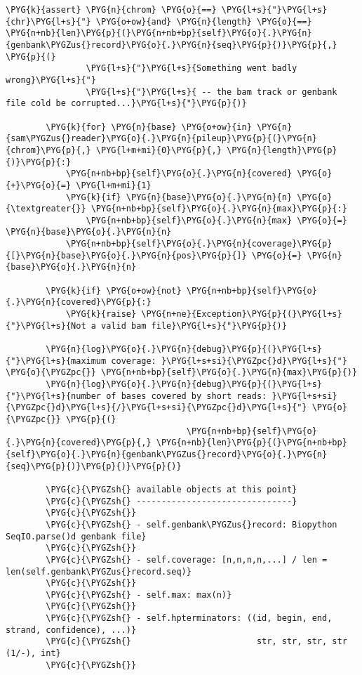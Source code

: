 \begin{Verbatim}[commandchars=\\\{\}]
        \PYG{k}{assert} \PYG{n}{chrom} \PYG{o}{==} \PYG{l+s}{"}\PYG{l+s}{chr}\PYG{l+s}{"} \PYG{o+ow}{and} \PYG{n}{length} \PYG{o}{==} \PYG{n+nb}{len}\PYG{p}{(}\PYG{n+nb+bp}{self}\PYG{o}{.}\PYG{n}{genbank\PYGZus{}record}\PYG{o}{.}\PYG{n}{seq}\PYG{p}{)}\PYG{p}{,} \PYG{p}{(}
                \PYG{l+s}{"}\PYG{l+s}{Something went badly wrong}\PYG{l+s}{"}
                \PYG{l+s}{"}\PYG{l+s}{ -- the bam track or genbank file cold be corrupted...}\PYG{l+s}{"}\PYG{p}{)}

        \PYG{k}{for} \PYG{n}{base} \PYG{o+ow}{in} \PYG{n}{sam\PYGZus{}reader}\PYG{o}{.}\PYG{n}{pileup}\PYG{p}{(}\PYG{n}{chrom}\PYG{p}{,} \PYG{l+m+mi}{0}\PYG{p}{,} \PYG{n}{length}\PYG{p}{)}\PYG{p}{:}
            \PYG{n+nb+bp}{self}\PYG{o}{.}\PYG{n}{covered} \PYG{o}{+}\PYG{o}{=} \PYG{l+m+mi}{1}
            \PYG{k}{if} \PYG{n}{base}\PYG{o}{.}\PYG{n}{n} \PYG{o}{\textgreater{}} \PYG{n+nb+bp}{self}\PYG{o}{.}\PYG{n}{max}\PYG{p}{:}
                \PYG{n+nb+bp}{self}\PYG{o}{.}\PYG{n}{max} \PYG{o}{=} \PYG{n}{base}\PYG{o}{.}\PYG{n}{n}
            \PYG{n+nb+bp}{self}\PYG{o}{.}\PYG{n}{coverage}\PYG{p}{[}\PYG{n}{base}\PYG{o}{.}\PYG{n}{pos}\PYG{p}{]} \PYG{o}{=} \PYG{n}{base}\PYG{o}{.}\PYG{n}{n}

        \PYG{k}{if} \PYG{o+ow}{not} \PYG{n+nb+bp}{self}\PYG{o}{.}\PYG{n}{covered}\PYG{p}{:}
            \PYG{k}{raise} \PYG{n+ne}{Exception}\PYG{p}{(}\PYG{l+s}{"}\PYG{l+s}{Not a valid bam file}\PYG{l+s}{"}\PYG{p}{)}

        \PYG{n}{log}\PYG{o}{.}\PYG{n}{debug}\PYG{p}{(}\PYG{l+s}{"}\PYG{l+s}{maximum coverage: }\PYG{l+s+si}{\PYGZpc{}d}\PYG{l+s}{"} \PYG{o}{\PYGZpc{}} \PYG{n+nb+bp}{self}\PYG{o}{.}\PYG{n}{max}\PYG{p}{)}
        \PYG{n}{log}\PYG{o}{.}\PYG{n}{debug}\PYG{p}{(}\PYG{l+s}{"}\PYG{l+s}{number of bases covered by short reads: }\PYG{l+s+si}{\PYGZpc{}d}\PYG{l+s}{/}\PYG{l+s+si}{\PYGZpc{}d}\PYG{l+s}{"} \PYG{o}{\PYGZpc{}} \PYG{p}{(}
                                    \PYG{n+nb+bp}{self}\PYG{o}{.}\PYG{n}{covered}\PYG{p}{,} \PYG{n+nb}{len}\PYG{p}{(}\PYG{n+nb+bp}{self}\PYG{o}{.}\PYG{n}{genbank\PYGZus{}record}\PYG{o}{.}\PYG{n}{seq}\PYG{p}{)}\PYG{p}{)}\PYG{p}{)}

        \PYG{c}{\PYGZsh{} available objects at this point}
        \PYG{c}{\PYGZsh{} -------------------------------}
        \PYG{c}{\PYGZsh{}}
        \PYG{c}{\PYGZsh{} - self.genbank\PYGZus{}record: Biopython SeqIO.parse()d genbank file}
        \PYG{c}{\PYGZsh{}}
        \PYG{c}{\PYGZsh{} - self.coverage: [n,n,n,n,...] / len = len(self.genbank\PYGZus{}record.seq)}
        \PYG{c}{\PYGZsh{}}
        \PYG{c}{\PYGZsh{} - self.max: max(n)}
        \PYG{c}{\PYGZsh{}}
        \PYG{c}{\PYGZsh{} - self.hpterminators: ((id, begin, end, strand, confidence), ...)}
        \PYG{c}{\PYGZsh{}                         str, str, str, str (1/-), int}
        \PYG{c}{\PYGZsh{}}


\end{Verbatim}
